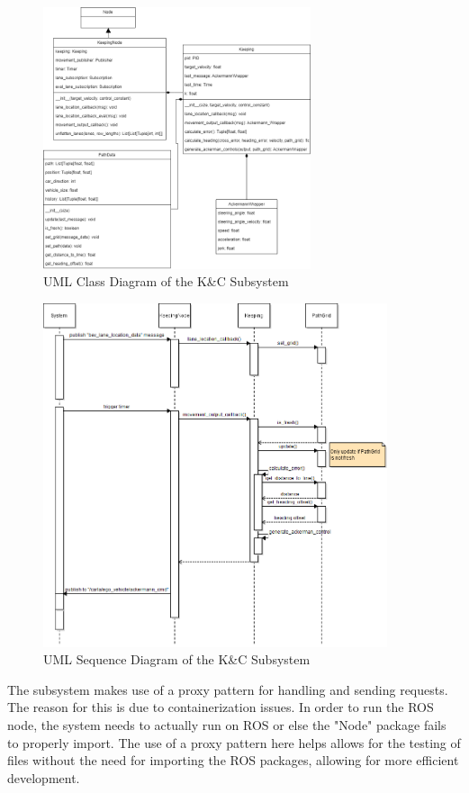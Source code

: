\documentclass[titlepage,draft]{article}
\begin{document}
{\begin{figure}
	\centering
	\includegraphics[width=0.7\textwidth]{KnC_diagrams}
	\caption{UML Class Diagram of the K\&C Subsystem}
	\label{fig:control_class}
\end{figure}

\begin{figure}
	\centering
	\includegraphics[width=0.9\textwidth]{KnC_sequence.png}
	\caption{UML Sequence Diagram of the K\&C Subsystem}
	\label{fig:control_sequence}
\end{figure}

The subsystem makes use of a proxy pattern for handling and sending requests. The reason for this is due to containerization issues. In order to run the ROS node, the system needs to actually run on ROS or else the "Node" package fails to properly import. The use of a proxy pattern here helps allows for the testing of files without the need for importing the ROS packages, allowing for more efficient development.


}
\end{document}
